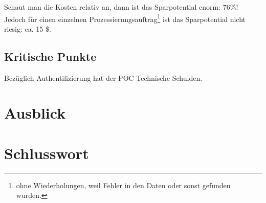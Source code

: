 Schaut man die Kosten relativ an, dann ist das Sparpotential enorm: 76\%! Jedoch für einen einzelnen Prozessierungsauftrag\footnote{ohne Wiederholungen, weil Fehler in den Daten oder sonst gefunden wurden.} ist das Sparpotential nicht riesig: ca. 15 \$.

\subsection{Kritische Punkte}
Bezüglich Authentifizierung hat der POC Technische Schulden.


\section{Ausblick}

\section{Schlusswort}
